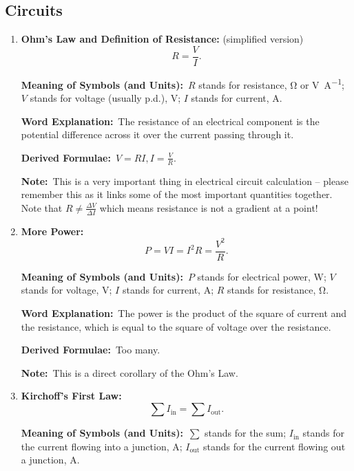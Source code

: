 \documentclass[8pt]{article}
\newcommand{\MeanSymb}{\textbf{Meaning of Symbols (and Units):}\ }
\newcommand{\WordExpl}{\textbf{Word Explanation:}\ }
\newcommand{\DeriForm}{\textbf{Derived Formulae:}\ }
\newcommand{\Note}{\textbf{Note:}\ }
\begin{document}
        \subsection{Circuits}
            \begin{enumerate}
                \item \textbf{Ohm's Law and Definition of Resistance:} (simplified version)
                \[
                    R = \frac{V}{I}.
                \]

                \MeanSymb \(R\) stands for resistance, \unit{\ohm} or \unit{\volt\per\ampere}; \(V\) stands for voltage (usually p.d.), \unit{\volt}; \(I\) stands for current, \unit{\ampere}.

                \WordExpl The resistance of an electrical component is the potential difference across it over the current passing through it.

                \DeriForm \(V = RI, I = \frac{V}{R}\).

                \Note This is a very important thing in electrical circuit calculation -- please remember this as it links some of the most important quantities together. Note that \(R \neq \frac{\Delta V}{\Delta I}\) which means resistance is not a gradient at a point!

                \item \textbf{More Power:}
                \[
                    P = VI = I^2 R = \frac{V^2}{R}.
                \]

                \MeanSymb \(P\) stands for electrical power, \unit{\watt}; \(V\) stands for voltage, \unit{\volt}; \(I\) stands for current, \unit{\ampere}; \(R\) stands for resistance, \unit{\ohm}.

                \WordExpl The power is the product of the square of current and the resistance, which is equal to the square of voltage over the resistance.

                \DeriForm Too many.

                \Note This is a direct corollary of the Ohm's Law.

                \item \textbf{Kirchoff's First Law:}
                \[
                    \sum I_{\text{in}} = \sum I_{\text{out}}.
                \]

                \MeanSymb \(\sum\) stands for the sum; \(I_{\text{in}}\) stands for the current flowing into a junction, \unit{\ampere}; \(I_{\text{out}}\) stands for the current flowing out a junction, \unit{\ampere}.


\end{enumerate}
\end{document}

